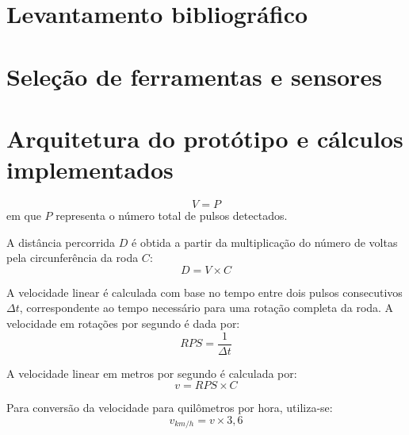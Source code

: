 \lipsum[1]

\section{Levantamento bibliográfico}

\lipsum[1]

\section{Seleção de ferramentas e sensores}
\lipsum[5]

\section{Arquitetura do protótipo e cálculos implementados}

\lipsum[3]

\begin{equation}
V = P
\end{equation}
em que \(P\) representa o número total de pulsos detectados.

A distância percorrida \(D\) é obtida a partir da multiplicação do número de voltas pela circunferência da roda \(C\):
\begin{equation}
D = V \times C
\end{equation}

A velocidade linear é calculada com base no tempo entre dois pulsos consecutivos \(\Delta t\), correspondente ao tempo necessário para uma rotação completa da roda. A velocidade em rotações por segundo é dada por:
\begin{equation}
RPS = \frac{1}{\Delta t}
\end{equation}

A velocidade linear em metros por segundo é calculada por:
\begin{equation}
v = RPS \times C
\end{equation}

Para conversão da velocidade para quilômetros por hora, utiliza-se:
\begin{equation}
v_{km/h} = v \times 3{,}6
\end{equation}

\lipsum[3]


